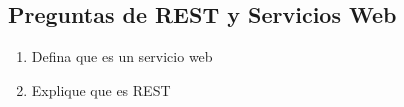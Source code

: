 \subsection{Preguntas de REST y Servicios
Web}\label{preguntas-de-rest-y-servicios-web}

\begin{enumerate}
\def\labelenumi{\arabic{enumi}.}
\itemsep1pt\parskip0pt
\item
  Defina que es un servicio web
\item
  Explique que es REST
\end{enumerate}
